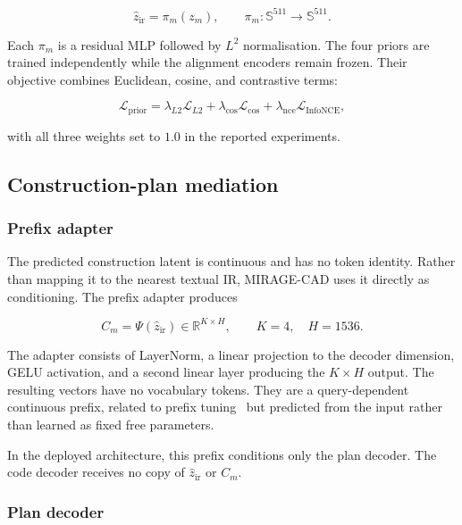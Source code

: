 \documentclass[preprint,12pt]{elsarticle}
\begin{document}
\begin{equation}
  \hat{z}_{\mathrm{ir}}
  =
  \pi_m(z_m),
  \qquad
  \pi_m :
  \mathbb{S}^{511}
  \rightarrow
  \mathbb{S}^{511}.
\end{equation}

Each $\pi_m$ is a residual MLP followed by $L^2$ normalisation. The four priors
are trained independently while the alignment encoders remain frozen. Their
objective combines Euclidean, cosine, and contrastive terms:

\begin{equation}
  \mathcal{L}_{\mathrm{prior}}
  =
  \lambda_{L2}\mathcal{L}_{L2}
  +
  \lambda_{\mathrm{cos}}\mathcal{L}_{\mathrm{cos}}
  +
  \lambda_{\mathrm{nce}}\mathcal{L}_{\mathrm{InfoNCE}},
\end{equation}

with all three weights set to $1.0$ in the reported experiments.


\subsection{Construction-plan mediation}
\label{sec:plan_mediation}

\subsubsection{Prefix adapter}
\label{sec:soft_prefix}

The predicted construction latent is continuous and has no token identity.
Rather than mapping it to the nearest textual IR, MIRAGE-CAD uses it directly
as conditioning. The prefix adapter produces

\begin{equation}
  C_m
  =
  \Psi(\hat{z}_{\mathrm{ir}})
  \in
  \mathbb{R}^{K\times H},
  \qquad
  K=4,\quad H=1536.
\end{equation}

The adapter consists of LayerNorm, a linear projection to the decoder
dimension, GELU activation, and a second linear layer producing the
$K\times H$ output. The resulting vectors have no vocabulary tokens. They are
a query-dependent continuous prefix, related to prefix
tuning~\cite{li2021prefixtuning} but predicted from the input rather than
learned as fixed free parameters.

In the deployed architecture, this prefix conditions only the plan decoder.
The code decoder receives no copy of $\hat{z}_{\mathrm{ir}}$ or $C_m$.


\subsubsection{Plan decoder}
\label{sec:plan_decoder}
\end{document}
